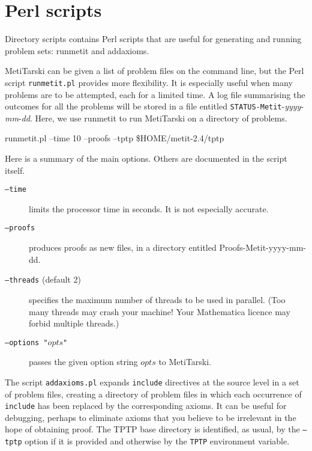 \documentclass[a4paper,11pt]{scrartcl}
\begin{document}
\section{Perl scripts}

Directory scripts contains Perl scripts that are useful for generating and running
problem sets: runmetit and addaxioms.

MetiTarski can be given a list of problem files on the command line, but the
Perl script \texttt{runmetit.pl} provides more flexibility.  It is especially useful when
many problems are to be attempted, each for a limited time.
A log file summarising the outcomes for all the problems will be stored in a file entitled
\texttt{STATUS-Metit}-\textit{yyyy}-\textit{mm}-\textit{dd}.
Here, we use runmetit to run MetiTarski on a directory of problems.
\begin{flushleft}\ttfamily
runmetit.pl --time 10 --proofs --tptp \$HOME/metit-2.4/tptp
\end{flushleft}

Here is a summary of the main options. Others are documented in the script itself.

\begin{description}

\item[\texttt{--time}] limits the processor time in seconds. It is not especially accurate.

\item[\texttt{--proofs}] produces proofs as new files, in a directory entitled Proofs-Metit-yyyy-mm-dd.

\item[\texttt{--threads} (default 2)] specifies the maximum number of threads to be used in parallel.
  (Too many threads may crash your machine! Your Mathematica licence may forbid
   multiple threads.)

\item[\texttt{--options "$opts$"}] passes the given option string $opts$ to MetiTarski.

\end{description}


The script \texttt{addaxioms.pl} expands \texttt{include} directives at the source level in a set
of problem files, creating a directory of problem files in which each occurrence
of \texttt{include} has been replaced by the corresponding axioms. It can be useful for
debugging, perhaps to eliminate axioms that you believe to be irrelevant in the
hope of obtaining proof. The TPTP base directory is identified, as usual, by the
\texttt{--tptp} option if it is provided and otherwise by the \texttt{TPTP} environment variable.
\end{document}
